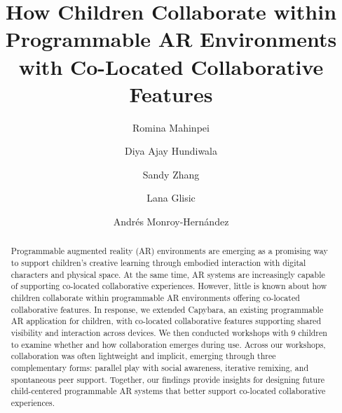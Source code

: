 \documentclass[sigconf,nonacm]{acmart}
\begin{document}
\title{How Children Collaborate within Programmable AR Environments with Co-Located Collaborative Features}

\author{Romina Mahinpei}

\author{Diya Ajay Hundiwala}

\author{Sandy Zhang}

\author{Lana Glisic}

\author{Andrés Monroy-Hernández}


\renewcommand{\shortauthors}{Mahinpei et al.}

\begin{abstract}
Programmable augmented reality (AR) environments are emerging as a promising way to support children’s creative learning through embodied interaction with digital characters and physical space. At the same time, AR systems are increasingly capable of supporting co-located collaborative experiences. However, little is known about how children collaborate within programmable AR environments offering co-located collaborative features. In response, we extended Capybara, an existing programmable AR application for children, with co-located collaborative features supporting shared visibility and interaction across devices. We then conducted workshops with 9 children to examine whether and how collaboration emerges during use. Across our workshops, collaboration was often lightweight and implicit, emerging through three complementary forms: parallel play with social awareness, iterative remixing, and spontaneous peer support. Together, our findings provide insights for designing future child-centered programmable AR systems that better support co-located collaborative experiences.
\end{abstract}
\end{document}
